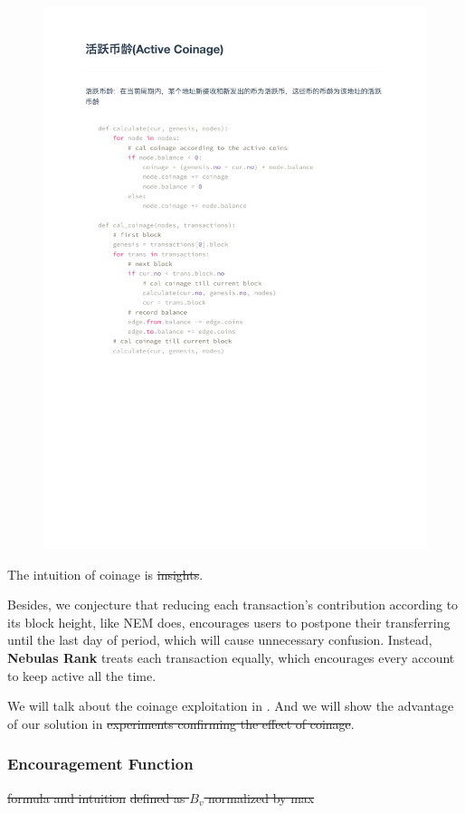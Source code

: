 \begin{figure}
\includegraphics{coinage.pdf}
\end{figure}


The intuition of coinage is \st{insights}.

Besides, we conjecture that reducing each transaction's contribution according to its block height, like NEM does\cite{nem}, encourages users to postpone their transferring until the last day of period, which will cause unnecessary confusion. Instead, \textbf{Nebulas Rank} treats each transaction equally, which encourages every account to keep active all the time.

We will talk about the coinage exploitation in . And we will show the advantage of our solution in  \st{experiments confirming the effect of coinage}.


\subsubsection{Encouragement Function}\label{subsec:encouragement}
\st{formula and intuition} \st{defined as $B_v$ normalized by max}

